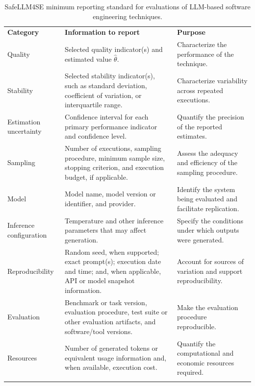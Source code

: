\documentclass{IEEEcsmag}
\begin{document}
\begin{table}%
	\vspace*{4pt}
	\caption{SafeLLM4SE minimum reporting standard for evaluations of LLM-based software engineering techniques.}
	\label{table:report}
	\begin{tabular*}{\linewidth}{@{\extracolsep\fill} p{1.8cm} p{7.6cm} p{4.8cm}}
		\toprule
		\textbf{Category}                & \textbf{Information to report}                                                                                                            & \textbf{Purpose}                                                        \\
		\colrule
		Quality                 & Selected quality indicator(s) and estimated value $\hat{\theta}$.                                 & Characterize the performance of the technique.                  \\
		Stability               & Selected stability indicator(s), such as standard deviation,   coefficient of variation, or interquartile range.                  & Characterize variability across repeated executions.            \\
		Estimation \newline uncertainty  & Confidence interval for each primary performance indicator and confidence level.                                                & Quantify the precision of the reported estimates.               \\
		Sampling                & Number of executions, sampling procedure,   minimum sample size, stopping criterion, and execution budget, if applicable.         & Assess the adequacy and efficiency of the sampling procedure.   \\
		Model                   & Model name, model version or identifier, and provider.                                                                            & Identify the system being evaluated and facilitate replication. \\
		Inference \newline configuration & Temperature and other inference parameters that may affect generation.                                                            & Specify the conditions under which outputs were generated.      \\
		Reproducibility         & Random seed, when supported; exact prompt(s); execution date and time;   and, when applicable, API or model snapshot information. & Account for sources of variation and support reproducibility.   \\
		Evaluation              & Benchmark or task version, evaluation procedure, test suite or other   evaluation artifacts, and software/tool versions.          & Make the evaluation procedure reproducible.                     \\
		Resources               & Number of generated tokens or equivalent usage information and, when   available, execution cost.                                 & Quantify the computational and economic resources required.    \\
		\botrule
	\end{tabular*} \vspace*{8pt}
\end{table}
\end{document}
